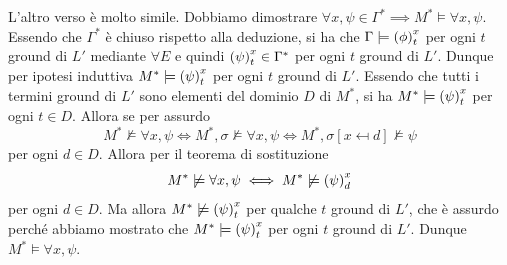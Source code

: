 L'altro verso è molto simile. Dobbiamo dimostrare \(\forall x, \psi \in \Gamma^*\implies M^* \models \forall x, \psi\).
Essendo che \(\Gamma^*\) è chiuso rispetto alla deduzione, si ha che \(\Gamma \models {{\left(\phi\right)}^{x}_{t}}\) per ogni \(t\) ground di \(L'\) mediante \(\forall E\) e quindi \({{\left(\psi\right)}^{x}_{t}} \in \Gamma^*\) per ogni \(t\) ground di \(L'\). Dunque per ipotesi induttiva \(M^* \models {{\left(\psi\right)}^{x}_{t}}\) per ogni \(t\) ground di \(L'\). Essendo che tutti i termini ground di \(L'\) sono elementi del dominio \(D\) di \(M^*\), si ha \(M^* \models {{\left(\psi\right)}^{x}_{t}}\) per ogni \(t\in D\). Allora se per assurdo
\[M^* \not\models \forall x, \psi \iff M^* ,\sigma \not\models \forall x, \psi \iff M^*,\sigma[x\mapsfrom d] \not\models \psi\]
per ogni \(d \in D\).
Allora per il teorema di sostituzione
\[M^*\not\models \forall x, \psi\iff M^* \not\models {{\left(\psi\right)}^{x}_{d}}\]
per ogni \(d\in D\). Ma allora \(M^* \not\models {{\left(\psi\right)}^{x}_{t}}\) per qualche \(t\) ground di \(L'\), che è assurdo perché abbiamo mostrato che \(M^* \models {{\left(\psi\right)}^{x}_{t}}\) per ogni \(t\) ground di \(L'\). Dunque \(M^* \models \forall x, \psi\).